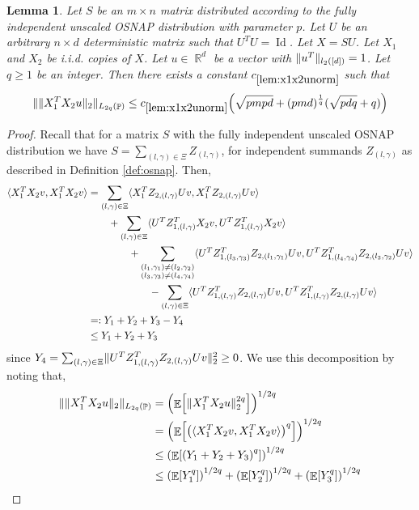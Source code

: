 \documentclass[11pt]{amsart}
\numberwithin{equation}{section}
\numberwithin{equation}{section}
\DeclareMathOperator{\E}{\mathbb{E}}
\DeclareMathOperator{\R}{\mathbb{R}}
\DeclareMathOperator{\Pb}{\mathbb{P}}
\DeclarePairedDelimiter{\norm}{\lVert}{\rVert}
\DeclarePairedDelimiter{\ip}{\langle}{\rangle}
\DeclarePairedDelimiter{\paren}{(}{)}
\DeclarePairedDelimiter{\sqbr}{[}{]}
\newtheorem{lemma}[theorem]{Lemma}
\begin{document}
\begin{lemma}\label{lem:x1x2unorm}
    Let $S$ be an $m \times n$ matrix distributed according to the fully independent unscaled OSNAP distribution with parameter $p$. Let $U$ be an arbitrary $n \times d$ deterministic matrix such that $U^TU=\operatorname{Id}$. Let $X=SU$. Let $X_1$ and $X_2$ be i.i.d. copies of $X$. Let $u \in \R^d$ be a vector with $\norm{u^T}_{l_2([d])}=1$. Let $q \ge 1$ be an integer. Then there exists a constant $c_{\ref{lem:x1x2unorm}}$ such that
\begin{align*}
    \norm{\norm{X_1^TX_2u}_2}_{L_{2q}(\Pb)} \le c_{\ref{lem:x1x2unorm}}\paren*{\sqrt{pmpd}+ (pmd)^\frac{1}{q} (\sqrt{pdq} + q)}
\end{align*}
\end{lemma}
\begin{proof}

Recall that for a matrix $S$ with the fully independent unscaled OSNAP distribution we have $S= \sum_{(l,\gamma) \in \Xi} Z_{(l,\gamma)}$, for independent summands $Z_{(l,\gamma)}$ as described in Definition \ref{def:osnap}. Then,
\begin{align*}
    \ip{X_1^TX_2v,X_1^TX_2v} &=\sum_{(l,\gamma) \in \Xi} \ip{X_1^TZ_{2,(l,\gamma)}Uv,X_1^TZ_{2,(l,\gamma)}Uv} \\
    & \qquad + \sum_{(l,\gamma)\in \Xi} \ip{U^T Z^T_{1,(l,\gamma)}X_2v,U^TZ^T_{1,(l,\gamma) }X_2v} \\
    &\qquad \qquad +\sum_{\substack{(l_1, \gamma_1) \neq (l_2, \gamma_2) \\ (l_3, \gamma_3) \neq (l_4, \gamma_4)}} \ip{U^TZ^T_{1,(l_3,\gamma_3) }Z_{2,(l_1,\gamma_1)}Uv,U^TZ^T_{1,(l_4,\gamma_4) }Z_{2,(l_2, \gamma_2)}Uv} \\
    &\qquad \qquad \qquad - \sum_{(l,\gamma) \in \Xi} \ip{U^TZ^T_{1,(l,\gamma) }Z_{2,(l,\gamma)}Uv,U^TZ^T_{1,(l,\gamma) }Z_{2,(l, \gamma)}Uv} \\
    &=: Y_1 + Y_2 + Y_3 - Y_4 \\
    &\le Y_1 + Y_2 + Y_3
\end{align*}
since $Y_4 = \sum_{(l,\gamma) \in \Xi} \norm{U^TZ^T_{1,(l,\gamma) }Z_{2,(l, \gamma)}Uv}_2^2 \ge 0$. We use this decomposition by noting that,
\begin{align*}
    \norm{\norm{X_1^TX_2u}_2}_{L_{2q}(\Pb)} &= \paren*{ \E \sqbr*{ \norm{X_1^TX_2u}_2^{2q} } }^{1/2q} \\ 
    &= \paren*{ \E \sqbr*{ \paren*{\ip{X_1^TX_2v,X_1^TX_2v}}^{q} } }^{1/2q}\\
    &\le \paren*{ \E \sqbr*{ \paren*{Y_1 + Y_2 + Y_3 }^{q} } }^{1/2q}\\
    &\le \paren*{\E \sqbr*{Y_1^q}}^{1/2q} + \paren*{\E \sqbr*{Y_2^q}}^{1/2q} + \paren*{\E \sqbr*{Y_3^q}}^{1/2q}
\end{align*}


\end{proof}
\end{document}
